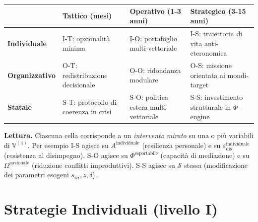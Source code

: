 {\def\LTcaptype{none} %
{\small\begin{longtable}[]{@{}
  >{\raggedright\arraybackslash}p{}
  >{\raggedright\arraybackslash}p{}
  >{\raggedright\arraybackslash}p{}
  >{\raggedright\arraybackslash}p{}@{}}
\toprule\noalign{}
\begin{minipage}[b]{\linewidth}\raggedright
\end{minipage} & \begin{minipage}[b]{\linewidth}\raggedright
\textbf{Tattico} (mesi)
\end{minipage} & \begin{minipage}[b]{\linewidth}\raggedright
\textbf{Operativo} (1-3 anni)
\end{minipage} & \begin{minipage}[b]{\linewidth}\raggedright
\textbf{Strategico} (3-15 anni)
\end{minipage} \\
\midrule\noalign{}
\endhead
\bottomrule\noalign{}
\endlastfoot
\textbf{Individuale} & I-T: opzionalità minima & I-O: portafoglio
multi-vettoriale & I-S: traiettoria di vita anti-eteronomica \\
\textbf{Organizzativo} & O-T: redistribuzione decisionale & O-O:
ridondanza modulare & O-S: missione orientata ai mondi-target \\
\textbf{Statale} & S-T: protocollo di coerenza in crisi & S-O: politica
estera multi-vettoriale & S-S: investimento strutturale in
\(\Phi\)-engine \\
\end{longtable}}
}

\Proved{} \textbf{Lettura.} Ciascuna cella corrisponde a un
\emph{intervento mirato} su una o più variabili di \(\mathbb{V}^{(4)}\).
Per esempio I-S agisce su \(A^{\text{individuale}}\) (resilienza
personale) e su \(\varepsilon_{\text{dis}}^{\text{individuale}}\)
(resistenza al disimpegno). S-O agisce su \(\Phi^{\text{esportabile}}\)
(capacità di mediazione) e su \(\Omega^{\text{nazionale}}\) (riduzione
conflitti improduttivi). S-S agisce su \(\mathcal{S}\) stessa
(modificazione dei parametri esogeni \(s_{iii}, z, \delta\)).



\section{Strategie Individuali (livello
I)}\label{strategie-individuali-livello-i}

